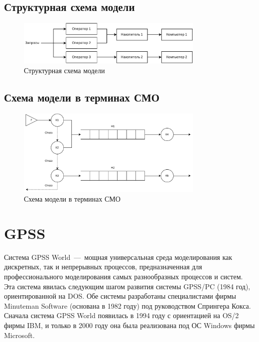 \newpage

\subsection*{Структурная схема модели}

\begin{figure}[ht]
    \centering
    \includegraphics[width=0.8\textwidth]{assets/struct.pdf}
    \caption{Структурная схема модели}
    \label{fig:struct}
\end{figure}

\subsection*{Схема модели в терминах СМО}

\begin{figure}[ht]
    \centering
    \includegraphics[width=0.8\textwidth]{assets/smo.pdf}
    \caption{Схема модели в терминах СМО}
    \label{fig:smo}
\end{figure}

\section{GPSS}

Система GPSS World~---~мощная универсальная среда моделирования как дискретных, так и непрерывных процессов, предназначенная для профессионального моделирования самых разнообразных процессов и систем. Эта система явилась следующим шагом развития системы GPSS/PC (1984 год), ориентированной на DOS. Обе системы разработаны специалистами фирмы Minuteman Software (основана в 1982 году) под руководством Спрингера Кокса. Сначала система GPSS World появилась в 1994 году с ориентацией на OS/2 фирмы IBM, и только в 2000 году она была реализована под ОС Windows фирмы Microsoft.

